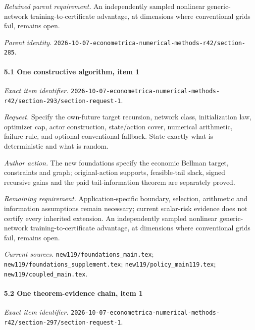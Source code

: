 \par\emph{Retained parent requirement.} An independently sampled nonlinear generic-network training-to-certificate advantage, at dimensions where conventional grids fail, remains open.

\par\emph{Parent identity.} \nolinkurl{2026-10-07-econometrica-numerical-methods-r42/section-285}.

\paragraph{5.1 One constructive algorithm, item 1}

\emph{Exact item identifier.} \nolinkurl{2026-10-07-econometrica-numerical-methods-r42/section-293/section-request-1}.

\par\emph{Request.} Specify the own-future target recursion, network class, initialization law, optimizer cap, actor construction, state/\allowbreak{}action cover, numerical arithmetic, failure rule, and optional conventional fallback. State exactly what is deterministic and what is random.

\par\emph{Author action.} The new foundations specify the economic Bellman target, constraints and graph; original-action supports, feasible-tail slack, signed recursive gains and the paid tail-information theorem are separately proved.

\par\emph{Remaining requirement.} Application-specific boundary, selection, arithmetic and information assumptions remain necessary; current scalar-risk evidence does not certify every inherited extension. An independently sampled nonlinear generic-network training-to-certificate advantage, at dimensions where conventional grids fail, remains open.

\par\emph{Current sources.} \nolinkurl{new119/foundations_main.tex}; \nolinkurl{new119/foundations_supplement.tex}; \nolinkurl{new119/policy_main119.tex}; \nolinkurl{new119/coupled_main.tex}.

\paragraph{5.2 One theorem-evidence chain, item 1}

\emph{Exact item identifier.} \nolinkurl{2026-10-07-econometrica-numerical-methods-r42/section-297/section-request-1}.

